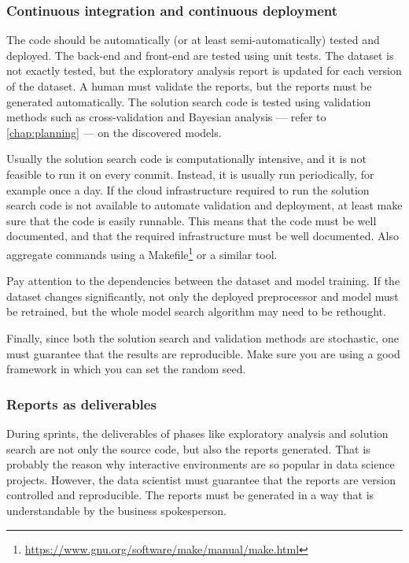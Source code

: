 \subsubsection{Continuous integration and continuous deployment}

The code should be
automatically (or at least semi-automatically) tested and deployed.  The back-end and
front-end are tested using unit tests.  The dataset is not exactly tested, but the
exploratory analysis report is updated for each version of the dataset.
A human must validate the reports, but the reports must be generated automatically.
The solution search code is tested using
validation methods such as cross-validation and Bayesian analysis --- refer to
\cref{chap:planning} --- on the discovered models.

Usually the solution search code is computationally intensive, and it is
not feasible to run it on every commit.  Instead, it is usually run periodically, for example
once a day.  If the cloud infrastructure required to run the solution search code is not
available to automate validation and deployment, at least make sure that the code is
easily runnable.  This means that the code must be well documented, and that the
required infrastructure must be well documented.  Also aggregate commands using a
Makefile\footnote{\url{https://www.gnu.org/software/make/manual/make.html}} or a similar tool.

Pay attention to the dependencies between the dataset and
model training.  If the dataset changes significantly, not only the deployed preprocessor
and model must be retrained, but the whole model search algorithm may need to be rethought.

Finally, since both the solution search and validation methods are stochastic, one
must guarantee that the results are reproducible.  Make sure you are using a good
framework in which you can set the random seed.

\subsubsection{Reports as deliverables}

During sprints, the deliverables of phases like exploratory analysis and solution search are
not only the source code, but also the reports generated.  That is probably the reason why
interactive environments are so popular in data science projects.  However, the data
scientist must guarantee that the reports are version controlled and reproducible.  The
reports must be generated in a way that is understandable by the business spokesperson.

